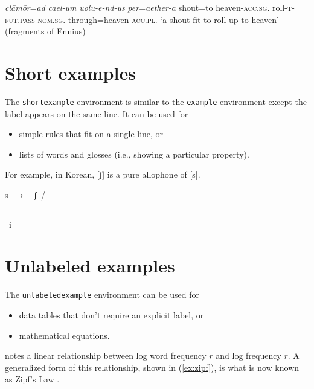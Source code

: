 \documentclass[draft,12pt]{article}
\begin{document}
\begin{example}
\gll \emph{clāmōr}=\emph{ad} \emph{cael-um}          \emph{uolu-e-nd-us}                                \emph{per}=\emph{aether-a}
     shout=to                heaven-\textsc{acc.sg.} roll-\textsc{t}-\textsc{fut.pass}-\textsc{nom.sg.} through=heaven-\textsc{acc.pl.}
\glt `a shout fit to roll up to heaven' (fragments of Ennius)
\end{example}

\section{Short examples}

The \texttt{shortexample} environment is similar to the \texttt{example} environment except the label appears on the same line. It can be used for

\begin{itemize}
\item simple rules that fit on a single line, or
\item lists of words and glosses (i.e., showing a particular property).
\end{itemize}

For example, in Korean, [ʃ] is a pure allophone of [s].

\begin{shortexample}
s~$\rightarrow$~~ʃ~/~\rule{1em}{.5pt}~i
\label{ex:palatalization}
\end{shortexample}

\section{Unlabeled examples}

The \texttt{unlabeledexample} environment can be used for

\begin{itemize}
\item data tables that don't require an explicit label, or
\item mathematical equations.
\end{itemize}

\citet{Zipf1949} notes a linear relationship between log word frequency $r$ and log frequency $r$. A generalized form of this relationship, shown in (\ref{ex:zipf}), is what is now known as Zipf's Law \citep[e.g.,][]{Baroni2009}.
\end{document}
